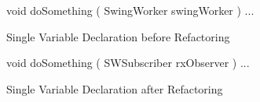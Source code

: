 \begin{figure}[H]
\begin{minipage}{0.48\textwidth}
\begin{sourcecode}
\begin{javacode}{}
void doSomething ( SwingWorker swingWorker ) {...}
\end{javacode}
\caption{Single Variable Declaration before Refactoring}
\label{code:svd-before}
\end{sourcecode}
\end{minipage}\hspace{0.7cm}
\begin{minipage}{0.48\textwidth}
\begin{sourcecode}
\begin{javacode}{}
void doSomething ( SWSubscriber rxObserver ) {...}
\end{javacode}
\caption{Single Variable Declaration after Refactoring}
\label{code:svd-after}
\end{sourcecode}
\end{minipage}
\end{figure}